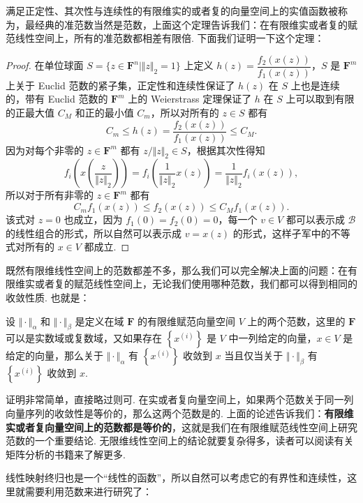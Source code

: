 满足正定性、其次性与连续性的有限维实的或者复的向量空间上的实值函数被称为，最经典的准范数当然是范数，上面这个定理告诉我们：在有限维实或者复的赋范线性空间上，所有的准范数都相差有限倍. 下面我们证明一下这个定理：

\begin{proof}
    在单位球面 $S = \{z\in \mathbf{F}^n \mid \Vert z\Vert_2 = 1\}$ 上定义 $h(z) = \dfrac{f_2(x(z))}{f_1(x(z))}$，$S$ 是 $\mathbf{F}^m$ 上关于 Euclid 范数的紧子集，正定性和连续性保证了 $h(z)$ 在 $S$ 上也是连续的，带有 Euclid 范数的 $\mathbf{F}^m$ 上的 Weierstrass 定理保证了 $h$ 在 $S$ 上可以取到有限的正最大值 $C_M$ 和正的最小值 $C_m$，所以对所有的 $z\in S$ 都有 \[C_m\leqslant h(z) = \frac{f_2(x(z))}{f_1(x(z))}\leqslant C_M.\]
    因为对每个非零的 $z\in\mathbf{F}^m$ 都有 $z/\Vert z\Vert_2\in S$，根据其次性得知 \[f_i\left(x\left(\frac{z}{\Vert z\Vert_2}\right)\right) = f_i\left(\frac{1}{\Vert z\Vert_2}x(z)\right) = \frac{1}{\Vert z\Vert_2}f_i(x(z)),\]
    所以对于所有非零的 $z\in\mathbf{F}^m$ 都有 \[C_m f_1(x(z))\leqslant f_2(x(z))\leqslant C_M f_1(x(z)).\]
    该式对 $z = 0$ 也成立，因为 $f_1(0) = f_2(0) = 0$，每一个 $v\in V$ 都可以表示成 $\mathcal{B}$ 的线性组合的形式，所以自然可以表示成 $v = x(z)$ 的形式，这样孑军中的不等式对所有的 $x\in V$ 都成立.
\end{proof}

既然有限维线性空间上的范数都差不多，那么我们可以完全解决上面的问题：在有限维实或者复的赋范线性空间上，无论我们使用哪种范数，我们都可以得到相同的收敛性质. 也就是：

\begin{corollary}{}{}
    设 $\Vert \cdot\Vert_\alpha$ 和 $\Vert \cdot\Vert_\beta$ 是定义在域 $\mathbf{F}$ 的有限维赋范向量空间 $V$ 上的两个范数，这里的 $\mathbf{F}$ 可以是实数域或复数域，又如果存在 $\left\{x^{(i)}\right\}$ 是 $V$ 中一列给定的向量，$x\in V$ 是给定的向量，那么关于 $\Vert \cdot\Vert_\alpha$ 有 $\left\{x^{(i)}\right\}$ 收敛到 $x$ 当且仅当关于 $\Vert \cdot\Vert_\beta$ 有 $\left\{x^{(i)}\right\}$ 收敛到 $x$.
\end{corollary}

证明非常简单，直接略过则可. 在实或者复向量空间上，如果两个范数关于同一列向量序列的收敛性是等价的，那么这两个范数是的. 上面的论述告诉我们：\textbf{有限维实或者复向量空间上的范数都是等价的}，这就是我们在有限维赋范线性空间上研究范数的一个重要结论. 无限维线性空间上的结论就要复杂得多，读者可以阅读有关矩阵分析的书籍来了解更多.

线性映射终归也是一个“线性的函数”，所以自然可以考虑它的有界性和连续性，这里就需要利用范数来进行研究了：

